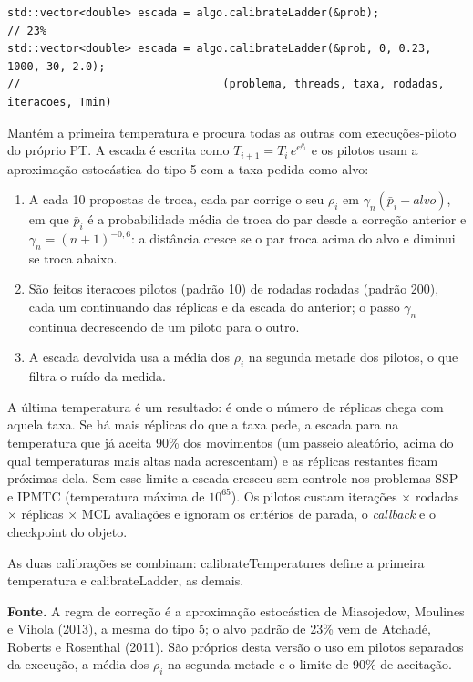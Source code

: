 \documentclass[10pt,a4paper]{article}
\newcommand{\code}[1]{{\ttfamily #1}}
\begin{document}
\begin{lstlisting}[style=cpp]
std::vector<double> escada = algo.calibrateLadder(&prob);                       // 23%
std::vector<double> escada = algo.calibrateLadder(&prob, 0, 0.23, 1000, 30, 2.0);
//                               (problema, threads, taxa, rodadas, iteracoes, Tmin)
\end{lstlisting}

Mantém a primeira temperatura e procura todas as outras com execuções-piloto do próprio PT. A escada é escrita como $T_{i+1} = T_i\,e^{e^{\rho_i}}$ e os pilotos usam a aproximação estocástica do tipo 5 com a taxa pedida como alvo:

\begin{enumerate}
\item A cada 10 propostas de troca, cada par corrige o seu $\rho_i$ em $\gamma_n(\bar{p}_i - \mathit{alvo})$, em que $\bar{p}_i$ é a probabilidade média de troca do par desde a correção anterior e $\gamma_n = (n+1)^{-0{,}6}$: a distância cresce se o par troca acima do alvo e diminui se troca abaixo.
\item São feitos \code{iteracoes} pilotos (padrão 10) de \code{rodadas} rodadas (padrão 200), cada um continuando das réplicas e da escada do anterior; o passo $\gamma_n$ continua decrescendo de um piloto para o outro.
\item A escada devolvida usa a média dos $\rho_i$ na segunda metade dos pilotos, o que filtra o ruído da medida. \end{enumerate}

A última temperatura é um resultado: é onde o número de réplicas chega com aquela taxa. Se há mais réplicas do que a taxa pede, a escada para na temperatura que já aceita 90\% dos movimentos (um passeio aleatório, acima do qual temperaturas mais altas nada acrescentam) e as réplicas restantes ficam próximas dela. Sem esse limite a escada cresceu sem controle nos problemas SSP e IPMTC (temperatura máxima de $10^{65}$). Os pilotos custam iterações $\times$ rodadas $\times$ réplicas $\times$ MCL avaliações e ignoram os critérios de parada, o \textit{callback} e o checkpoint do objeto.

As duas calibrações se combinam: \code{calibrateTemperatures} define a primeira temperatura e \code{calibrateLadder}, as demais.

\begin{fonte}
\textbf{Fonte.} A regra de correção é a aproximação estocástica de Miasojedow, Moulines e Vihola (2013), a mesma do tipo 5; o alvo padrão de 23\% vem de Atchadé, Roberts e Rosenthal (2011). São próprios desta versão o uso em pilotos separados da execução, a média dos $\rho_i$ na segunda metade e o limite de 90\% de aceitação.
\end{fonte}
\end{document}

